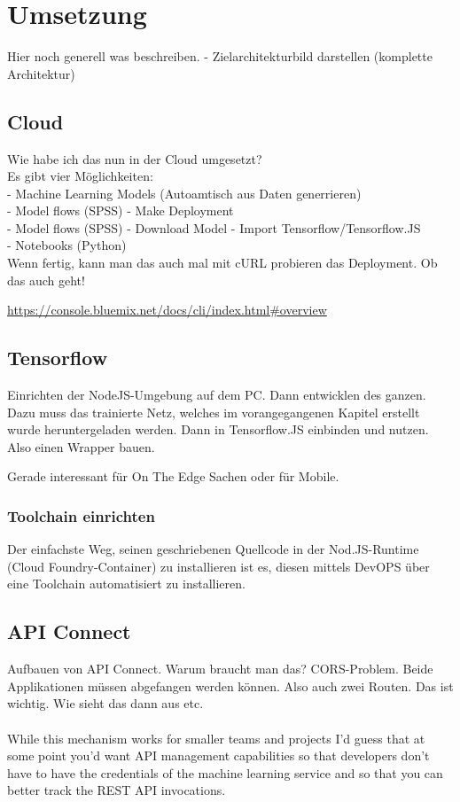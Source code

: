 \section{Umsetzung}
Hier noch generell was beschreiben. - Zielarchitekturbild darstellen (komplette Architektur)

\subsection{Cloud}
Wie habe ich das nun in der Cloud umgesetzt?\\
Es gibt vier Möglichkeiten:\\
- Machine Learning Models (Autoamtisch aus Daten generrieren)\\
- Model flows (SPSS) - Make Deployment\\
- Model flows (SPSS) - Download Model - Import Tensorflow/Tensorflow.JS\\
- Notebooks (Python)\\

Wenn fertig, kann man das auch mal mit cURL probieren das Deployment. Ob das auch geht!

\url{https://console.bluemix.net/docs/cli/index.html#overview}

\subsection{Tensorflow}
Einrichten der NodeJS-Umgebung auf dem PC. Dann entwicklen des ganzen. Dazu muss das trainierte Netz, welches im vorangegangenen
Kapitel erstellt wurde heruntergeladen werden. Dann in Tensorflow.JS einbinden und nutzen. Also einen Wrapper bauen.

Gerade interessant für On The Edge Sachen oder für Mobile.

\subsubsection{Toolchain einrichten}
Der einfachste Weg, seinen geschriebenen Quellcode in der Nod.JS-Runtime (Cloud Foundry-Container) zu installieren ist es,
diesen mittels DevOPS über eine Toolchain automatisiert zu installieren.

\subsection{API Connect}
Aufbauen von API Connect. Warum braucht man das? CORS-Problem. Beide Applikationen müssen abgefangen werden können. Also
auch zwei Routen. Das ist wichtig. Wie sieht das dann aus etc.
\\ \\
While this mechanism works for smaller teams and projects I’d guess that at some point you’d want API management
capabilities so that developers don’t have to have the credentials of the machine learning service and so that you can
better track the REST API invocations.